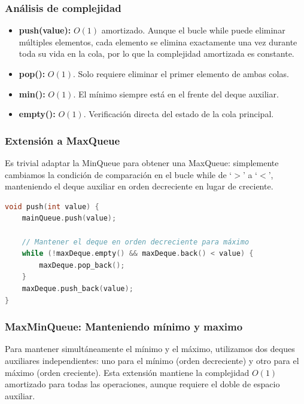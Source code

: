 \documentclass[12pt,a4paper]{article}
\begin{document}
\subsubsection{Análisis de complejidad}

\begin{itemize}
    \item \textbf{push(value):} $O(1)$ amortizado. Aunque el bucle while puede eliminar múltiples elementos, cada elemento se elimina exactamente una vez durante toda su vida en la cola, por lo que la complejidad amortizada es constante.
    
    \item \textbf{pop():} $O(1)$. Solo requiere eliminar el primer elemento de ambas colas.
    
    \item \textbf{min():} $O(1)$. El mínimo siempre está en el frente del deque auxiliar.
    
    \item \textbf{empty():} $O(1)$. Verificación directa del estado de la cola principal.
\end{itemize}

\subsubsection{Extensión a MaxQueue}

Es trivial adaptar la MinQueue para obtener una MaxQueue: simplemente cambiamos la condición de comparación en el bucle while de `$>$' a `$<$', manteniendo el deque auxiliar en orden decreciente en lugar de creciente.

\begin{lstlisting}[language=C++, label=lst:maxqueue_simple, caption={MaxMinQueue.hpp - Adaptación de MinQueue para MaxQueue}]
void push(int value) {
    mainQueue.push(value);
    
    // Mantener el deque en orden decreciente para máximo
    while (!maxDeque.empty() && maxDeque.back() < value) {
        maxDeque.pop_back();
    }
    maxDeque.push_back(value);
}
\end{lstlisting}

\subsubsection{MaxMinQueue: Manteniendo mínimo y maximo}

Para mantener simultáneamente el mínimo y el máximo, utilizamos dos deques auxiliares independientes: uno para el mínimo (orden decreciente) y otro para el máximo (orden creciente). Esta extensión mantiene la complejidad $O(1)$ amortizado para todas las operaciones, aunque requiere el doble de espacio auxiliar.
\end{document}
